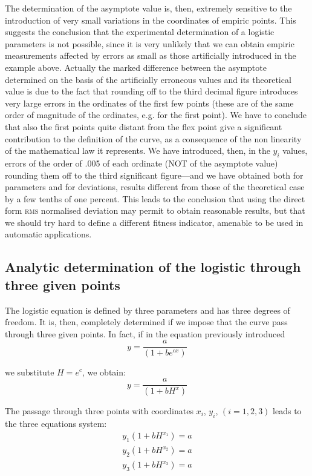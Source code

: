 \documentclass[%
 aip,
 jmp,%
 amsmath,amssymb,
 reprint,%
]{revtex4-1}
\begin{document}
The determination of the asymptote value is, then, extremely sensitive to the introduction of very small variations  in the  coordinates of empiric points. This suggests the conclusion that the experimental determination of a logistic parameters is not possible, since it is very unlikely that we can obtain empiric measurements affected by errors as small as those artificially introduced in the example above.
Actually the marked difference between the asymptote determined on the basis of the artificially erroneous values and its theoretical value is due to the fact that rounding off to the third decimal figure introduces very large errors in the ordinates of the first few points (these are of the same order of magnitude of the ordinates, e.g. for the first point). We have to conclude that also the first points quite distant from the flex point give a significant contribution to the definition of the curve, as a consequence of the non linearity of the mathematical law  it represents.
We have introduced, then, in the $y_i$ values, errors of the order of .005 of each ordinate (NOT of the asymptote value) rounding them off to the third significant figure---and we have obtained both for parameters and for deviations, results different from those of the theoretical case by a few tenths of one percent.
This leads to the conclusion that using the direct form \textsc{rms} normalised deviation may permit to obtain reasonable results, but  that we  should try hard to define a different fitness indicator, amenable to be used in automatic applications.


\subsection{\label{sec:level2}Analytic determination of the logistic through three given points}

The logistic equation is defined by three parameters and has three degrees of freedom. It is, then, completely determined if we impose that the curve pass through three given points. In fact, if in the equation previously introduced \[y = \frac{a}{(1 + be^{cx})}\]

we substitute $H = e^c$, we obtain: \[ y = \frac{a}{(1 + b H^x)} \]
		
The passage through three points with coordinates $x_i$, $y_i$, $(i = 1, 2, 3)$ leads to the three equations system:
\begin{eqnarray*}
y_1 (1 + b H^{x_1}) = a \\
y_2 (1 + b H^{x_2}) = a \\
y_3 (1 + b H^{x_3}) = a 
\end{eqnarray*}
\end{document}
